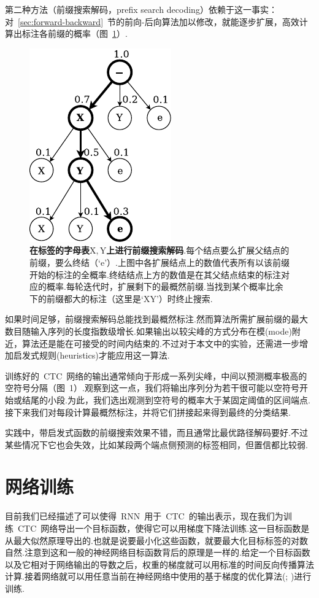 \documentclass{ctexart}
\begin{document}
第二种方法（前缀搜索解码，prefix search decoding）依赖于这一事实：对~\ref{sec:forward-backward}~节的前向-后向算法加以修改，就能逐步扩展，高效计算出标注各前缀的概率（图~\ref{fig:2}）.
\begin{figure}
	\label{fig:2}
	\centering
	\includegraphics[width=0.5\columnwidth]{fig/2}
	\caption{\textbf{在标签的字母表$\mathrm{X}, \mathrm{Y}$上进行前缀搜索解码}.每个结点要么扩展父结点的前缀，要么终结（`$\mathrm{e}$'）.上图中各扩展结点上的数值代表所有以该前缀开始的标注的全概率.终结结点上方的数值是在其父结点结束的标注对应的概率.每轮迭代时，扩展剩下的最概然前缀.当找到某个概率比余下的前缀都大的标注（这里是`$\mathrm{XY}$'）时终止搜索.}
\end{figure}

如果时间足够，前缀搜索解码总能找到最概然标注.然而算法所需扩展前缀的最大数目随输入序列的长度指数级增长.如果输出以较尖峰的方式分布在模(mode)附近，算法还是能在可接受的时间内结束的.不过对于本文中的实验，还需进一步增加启发式规则(heuristics)才能应用这一算法.

训练好的~CTC~网络的输出通常倾向于形成一系列尖峰，中间以预测概率极高的空符号分隔（图~1）.观察到这一点，我们将输出序列分为若干很可能以空符号开始或结尾的小段.为此，我们选出观测到空符号的概率大于某固定阈值的区间端点.接下来我们对每段计算最概然标注，并将它们拼接起来得到最终的分类结果.

实践中，带启发式函数的前缀搜索效果不错，而且通常比最优路径解码要好.不过某些情况下它也会失效，比如某段两个端点侧预测的标签相同，但置信都比较弱.
\section{网络训练}
\label{sec:training}
目前我们已经描述了可以使得~RNN~用于~CTC~的输出表示，现在我们为训练~CTC~网络导出一个目标函数，使得它可以用梯度下降法训练.这一目标函数是从最大似然原理导出的.也就是说要最小化这些函数，就要最大化目标标签的对数自然.注意到这和一般的神经网络目标函数\citep{bishop1995neural}背后的原理是一样的.给定一个目标函数以及它相对于网络输出的导数之后，权重的梯度就可以用标准的时间反向传播算法计算.接着网络就可以用任意当前在神经网络中使用的基于梯度的优化算法(\citealp{lecun1998efficient}; \citealp{schraudolph2002fast})进行训练.
\end{document}
